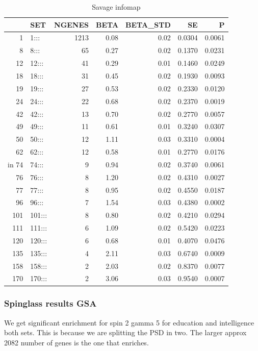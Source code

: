 \begin{table}[ht]
\centering
\begin{tabular}{rlrrrrr}
  \hline
 & SET & NGENES & BETA & BETA\_STD & SE & P \\ 
  \hline
1 & 1::: & 1213 & 0.08 & 0.02 & 0.0304 & 0.0061 \\ 
  8 & 8::: & 65 & 0.27 & 0.02 & 0.1370 & 0.0231 \\ 
  12 & 12::: & 41 & 0.29 & 0.01 & 0.1460 & 0.0249 \\ 
  18 & 18::: & 31 & 0.45 & 0.02 & 0.1930 & 0.0093 \\ 
  19 & 19::: & 27 & 0.53 & 0.02 & 0.2330 & 0.0120 \\ 
  24 & 24::: & 22 & 0.68 & 0.02 & 0.2370 & 0.0019 \\ 
  42 & 42::: & 13 & 0.70 & 0.02 & 0.2770 & 0.0057 \\ 
  49 & 49::: & 11 & 0.61 & 0.01 & 0.3240 & 0.0307 \\ 
  50 & 50::: & 12 & 1.11 & 0.03 & 0.3310 & 0.0004 \\ 
  62 & 62::: & 12 & 0.58 & 0.01 & 0.2770 & 0.0176 \\ in
  74 & 74::: &  9 & 0.94 & 0.02 & 0.3740 & 0.0061 \\ 
  76 & 76::: &  8 & 1.20 & 0.02 & 0.4310 & 0.0027 \\ 
  77 & 77::: &  8 & 0.95 & 0.02 & 0.4550 & 0.0187 \\ 
  96 & 96::: &  7 & 1.54 & 0.03 & 0.4380 & 0.0002 \\ 
  101 & 101::: &  8 & 0.80 & 0.02 & 0.4210 & 0.0294 \\ 
  111 & 111::: &  6 & 1.09 & 0.02 & 0.5420 & 0.0223 \\ 
  120 & 120::: &  6 & 0.68 & 0.01 & 0.4070 & 0.0476 \\ 
  135 & 135::: &  4 & 2.11 & 0.03 & 0.6740 & 0.0009 \\ 
  158 & 158::: &  2 & 2.03 & 0.02 & 0.8370 & 0.0077 \\ 
  170 & 170::: &  2 & 3.06 & 0.03 & 0.9540 & 0.0007 \\ 
   \hline
\end{tabular}
\caption{Savage infomap}
\label{tab:Infomap savage}
\end{table}





\subsubsection{Spinglass results GSA }
We get significant enrichment for spin 2 gamma 5 for education and intelligence both sets. This is because we are splitting the PSD in two. The larger approx 2082 number of genes is the one that enriches.

